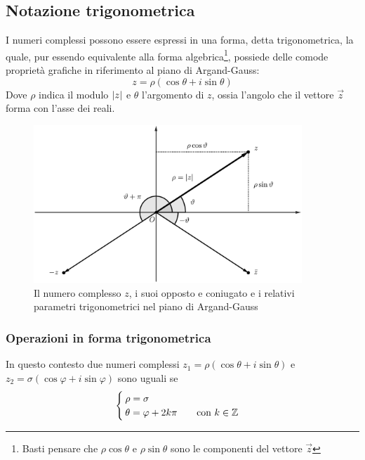 \subsection{Notazione trigonometrica}
I numeri complessi possono essere espressi in una forma, detta trigonometrica, la quale, pur essendo equivalente alla forma algebrica\footnote{Basti pensare che $\rho\cos\theta$ e $\rho\sin\theta$ sono le componenti del vettore $\vec z$}, possiede delle comode proprietà grafiche in riferimento al piano di Argand-Gauss:
\begin{equation}
	\label{compl:trigo}
	z=\rho(\cos\theta+i\sin{\theta})
\end{equation}
Dove $\rho$ indica il modulo $\left\lvert z \right\rvert$ e $\theta$ l'argomento di $z$, ossia l'angolo che il vettore $\vec z$ forma con l'asse dei reali.

\begin{figure}[ht]
	\centering
	\includegraphics[width=0.9\textwidth]{grafici/complessi2b}
	\caption{Il numero complesso $z$, i suoi opposto e coniugato e i relativi parametri trigonometrici nel piano di Argand-Gauss}
	\label{compl:fig2}
\end{figure}

\subsubsection{Operazioni in forma trigonometrica}
In questo contesto due numeri complessi $z_1=\rho(\cos\theta+i\sin\theta)$ e $z_2=\sigma(\cos\varphi+i\sin\varphi)$ sono uguali se
\[
	\begin{cases}
		\rho=\sigma \\
		\theta=\varphi+2k\pi\qquad\text{con }k\in\mathbb{Z}
	\end{cases}
\]

